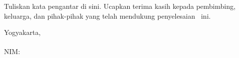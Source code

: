 \thispagestyle{empty}
\onehalfspace
\par
Tuliskan kata pengantar di sini. Ucapkan terima kasih kepada pembimbing, keluarga, dan pihak-pihak yang telah mendukung penyelesaian \documentType\ ini.

\vspace{20mm}
\begin{flushright}
	Yogyakarta, \submitMonth\ \submitYear \\
	\vspace{8mm}
	\studentName \\
	NIM: \nim
\end{flushright}